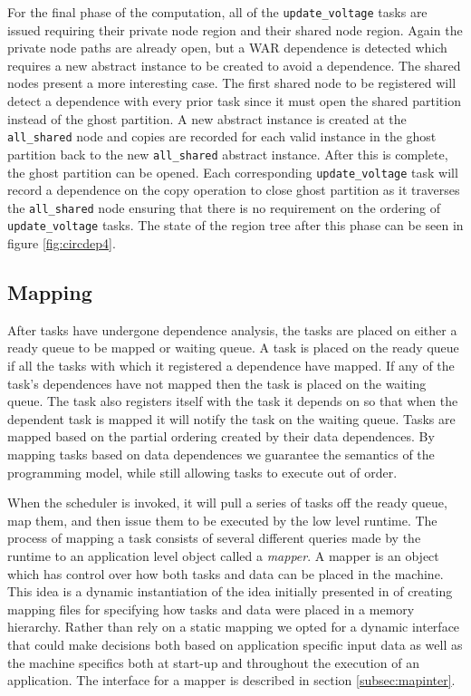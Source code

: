 For the final phase of the computation, all of the {\tt update\_voltage} tasks
are issued requiring their private node region and their shared node region.  Again
the private node paths are already open, but a WAR dependence is detected which
requires a new abstract instance to be created to avoid a dependence.  The
shared nodes present a more interesting case.  The first shared node to be registered
will detect a dependence with every prior task since it must open the shared partition
instead of the ghost partition.  A new abstract instance is created at the 
{\tt all\_shared} node and copies are recorded for each valid instance in the ghost partition
back to the new {\tt all\_shared} abstract instance.  After this is complete, the
ghost partition can be opened.  Each corresponding {\tt update\_voltage} task will record
a dependence on the copy operation to close ghost partition as it traverses the {\tt all\_shared}
node ensuring that there is no requirement on the ordering of {\tt update\_voltage}
tasks.  The state of the region tree after this phase can be seen in figure \ref{fig:circdep4}.

\subsection{Mapping}
\label{subsec:mapping}
After tasks have undergone dependence analysis, the tasks are placed on either a ready
queue to be mapped or waiting queue.  A task is placed on the ready queue if all the tasks with
which it registered a dependence have mapped.  If any of the task's dependences have
not mapped then the task is placed on the waiting queue.  The task also registers
itself with the task it depends on so that when the dependent task is mapped it will notify
the task on the waiting queue. Tasks are mapped based on the partial ordering created by 
their data dependences.  By mapping tasks based on data dependences we guarantee the 
semantics of the programming model, while still allowing tasks to execute out of order.

When the scheduler is invoked, it will pull a series of tasks off the ready queue, map them,
and then issue them to be executed by the low level runtime.  The process of mapping a task
consists of several different queries made by the runtime to an application level object
called a {\em mapper}.  A mapper is an object which has control over how both tasks and
data can be placed in the machine.  This idea is a dynamic instantiation of the idea
initially presented in \cite{Fatahalian06} of creating mapping files for specifying how
tasks and data were placed in a memory hierarchy.  Rather than rely on a static mapping
we opted for a dynamic interface that could make decisions both based on application specific
input data as well as the machine specifics both at start-up and throughout the execution
of an application.  The interface for a mapper is described in section \ref{subsec:mapinter}.

